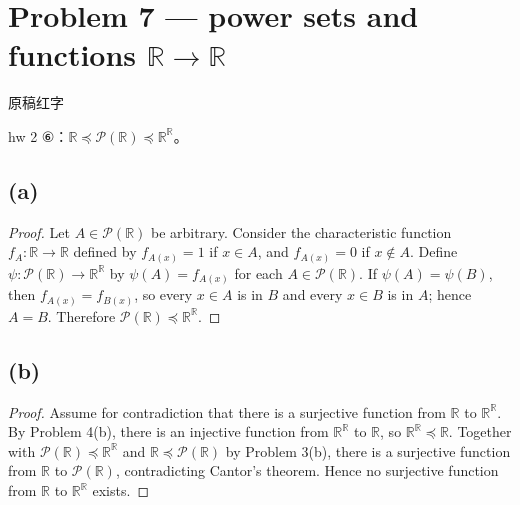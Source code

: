 \section{\texorpdfstring{Problem 7 --- power sets and functions \(\mathbb{R}\rightarrow\mathbb{R}\)}{Problem 7 --- power sets and functions \textbackslash mathbb\{R\}\textbackslash rightarrow\textbackslash mathbb\{R\}}}

\begin{qlnote}{原稿红字}

hw 2 ⑥：\(\mathbb{R} \preceq \mathcal{P}\left( \mathbb{R} \right) \preceq \mathbb{R}^{\mathbb{R}}\)。

\end{qlnote}

\subsection{(a)}

\begin{proof}

Let \(A \in \mathcal{P}\left( \mathbb{R} \right)\) be arbitrary. Consider the characteristic function \(f_{A}:\mathbb{R}\rightarrow\mathbb{R}\) defined by \(f_{A{(x)}} = 1\) if \(x \in A\), and \(f_{A{(x)}} = 0\) if \(x \notin A\). Define \(\psi:\mathcal{P}\left( \mathbb{R} \right)\rightarrow\mathbb{R}^{\mathbb{R}}\) by \(\psi(A) = f_{A{(x)}}\) for each \(A \in \mathcal{P}\left( \mathbb{R} \right)\). If \(\psi(A) = \psi(B)\), then \(f_{A{(x)}} = f_{B{(x)}}\), so every \(x \in A\) is in \(B\) and every \(x \in B\) is in \(A\); hence \(A = B\). Therefore \(\mathcal{P}\left( \mathbb{R} \right) \preceq \mathbb{R}^{\mathbb{R}}\).

\end{proof}

\subsection{(b)}

\begin{proof}

Assume for contradiction that there is a surjective function from \(\mathbb{R}\) to \(\mathbb{R}^{\mathbb{R}}\). By Problem 4(b), there is an injective function from \(\mathbb{R}^{\mathbb{R}}\) to \(\mathbb{R}\), so \(\mathbb{R}^{\mathbb{R}} \preceq \mathbb{R}\). Together with \(\mathcal{P}\left( \mathbb{R} \right) \preceq \mathbb{R}^{\mathbb{R}}\) and \(\mathbb{R} \preceq \mathcal{P}\left( \mathbb{R} \right)\) by Problem 3(b), there is a surjective function from \(\mathbb{R}\) to \(\mathcal{P}\left( \mathbb{R} \right)\), contradicting Cantor's theorem. Hence no surjective function from \(\mathbb{R}\) to \(\mathbb{R}^{\mathbb{R}}\) exists.

\end{proof}

